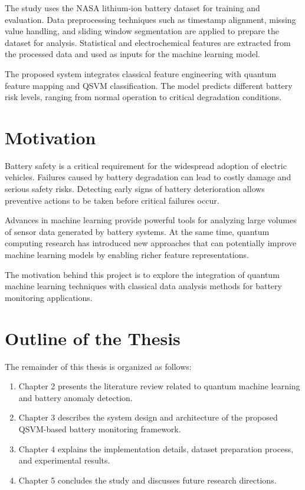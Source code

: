 The study uses the NASA lithium-ion battery dataset for training and evaluation. Data preprocessing techniques such as timestamp alignment, missing value handling, and sliding window segmentation are applied to prepare the dataset for analysis. Statistical and electrochemical features are extracted from the processed data and used as inputs for the machine learning model.

The proposed system integrates classical feature engineering with quantum feature mapping and QSVM classification. The model predicts different battery risk levels, ranging from normal operation to critical degradation conditions.

\section{Motivation}

Battery safety is a critical requirement for the widespread adoption of electric vehicles. Failures caused by battery degradation can lead to costly damage and serious safety risks. Detecting early signs of battery deterioration allows preventive actions to be taken before critical failures occur.

Advances in machine learning provide powerful tools for analyzing large volumes of sensor data generated by battery systems. At the same time, quantum computing research has introduced new approaches that can potentially improve machine learning models by enabling richer feature representations.

The motivation behind this project is to explore the integration of quantum machine learning techniques with classical data analysis methods for battery monitoring applications.

\section{Outline of the Thesis}

The remainder of this thesis is organized as follows:

\begin{enumerate}
\item Chapter 2 presents the literature review related to quantum machine learning and battery anomaly detection.

\item Chapter 3 describes the system design and architecture of the proposed QSVM-based battery monitoring framework.

\item Chapter 4 explains the implementation details, dataset preparation process, and experimental results.

\item Chapter 5 concludes the study and discusses future research directions.
\end{enumerate}